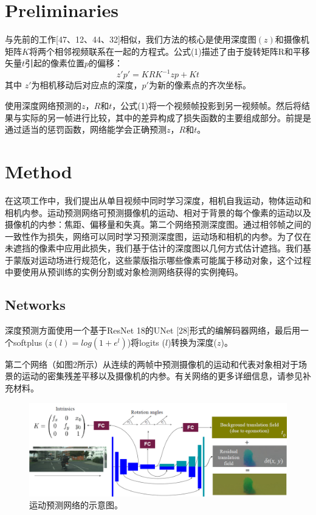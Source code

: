 \documentclass[10pt,journal,compsoc,UTF8]{IEEEtran}
\begin{document}
\section{Preliminaries}
与先前的工作[47、12、44、32]相似，我们方法的核心是使用深度图$(z)$和摄像机矩阵$K$将两个相邻视频联系在一起的方程式。公式(1)描述了由于旋转矩阵R和平移矢量$t$引起的像素位置$p$的偏移：
\begin{equation}
  z'p'=KRK^{-1}zp+Kt
\end{equation}
其中 $z'$为相机移动后对应点的深度，$p'$为新的像素点的齐次坐标。

使用深度网络预测的$z$，$R$和$t$，公式(1)将一个视频帧投影到另一视频帧。然后将结果与实际的另一帧进行比较，其中的差异构成了损失函数的主要组成部分。前提是通过适当的惩罚函数，网络能学会正确预测$z$，$R$和$t$。

%   

\section{Method}
在这项工作中，我们提出从单目视频中同时学习深度，相机自我运动，物体运动和相机内参。运动预测网络可预测摄像机的运动、相对于背景的每个像素的运动以及摄像机的内参：焦距、偏移量和失真。第二个网络预测深度图。通过相邻帧之间的一致性作为损失，网络可以同时学习预测深度图，运动场和相机的内参。为了仅在未遮挡的像素中应用此损失，我们基于估计的深度图以几何方式估计遮挡。我们基于蒙版对运动场进行规范化，这些蒙版指示哪些像素可能属于移动对象，这个过程中要使用从预训练的实例分割或对象检测网络获得的实例掩码。

\subsection{Networks}
深度预测方面使用一个基于ResNet 18的UNet [28]形式的编解码器网络，最后用一个softplus ($z(l) = log(1+e^{l})$)将logits ($l$)转换为深度($z$)。

第二个网络（如图2所示）从连续的两帧中预测摄像机的运动和代表对象相对于场景的运动的密集残差平移以及摄像机的内参。有关网络的更多详细信息，请参见补充材料。
\begin{figure}[htbp]
  \begin{framed}
      \centering
    \includegraphics[width=1\linewidth]{imgs/2.png} 
  \caption{运动预测网络的示意图。}
  \end{framed}
\end{figure}
\end{document}
